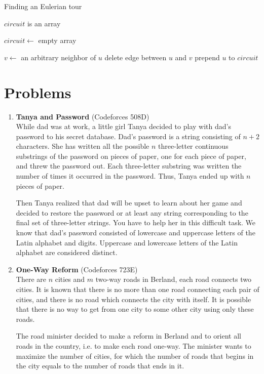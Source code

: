 \documentclass{article}
\begin{document}
\begin{algorithm}[H]
\caption{Finding an Eulerian tour}
\begin{algorithmic}

\State $circuit$ is an array

    \State $circuit \gets$ empty array
    \State {}
\EndFunction

        \State $v \gets$ an arbitrary neighbor of $u$
        \State delete edge between $u$ and $v$
        \State {}
    \EndWhile
    \State prepend $u$ to $circuit$
\EndFunction

\end{algorithmic}
\end{algorithm}


\section{Problems}

\begin{enumerate}
    \item \textbf{Tanya and Password} (Codeforces 508D)\\
    While dad was at work, a little girl Tanya decided to play with dad's password to his secret database. Dad's password is a string consisting of $n+2$ characters. She has written all the possible $n$ three-letter continuous substrings of the password on pieces of paper, one for each piece of paper, and threw the password out. Each three-letter substring was written the number of times it occurred in the password. Thus, Tanya ended up with $n$ pieces of paper.

    Then Tanya realized that dad will be upset to learn about her game and decided to restore the password or at least any string corresponding to the final set of three-letter strings. You have to help her in this difficult task. We know that dad's password consisted of lowercase and uppercase letters of the Latin alphabet and digits. Uppercase and lowercase letters of the Latin alphabet are considered distinct.
    
    \item \textbf{One-Way Reform} (Codeforces 723E)\\
    There are $n$ cities and $m$ two-way roads in Berland, each road connects two cities. It is known that there is no more than one road connecting each pair of cities, and there is no road which connects the city with itself. It is possible that there is no way to get from one city to some other city using only these roads.

    The road minister decided to make a reform in Berland and to orient all roads in the country, i.e. to make each road one-way. The minister wants to maximize the number of cities, for which the number of roads that begins in the city equals to the number of roads that ends in it.

\end{enumerate}
\end{document}
